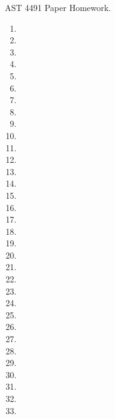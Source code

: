 \documentclass[12pt,preprint]{aastex}  %
\begin{document}
AST 4491 Paper Homework.

\begin{enumerate}
\item 
\item 
\item 
\item 
\item 
\item 
\item 
\item 
\item 
\item 
\item 
\item 
\item 
\item 
\item 
\item 
\item 
\item 
\item 
\item 
\item 
\item 
\item 
\item 
\item 
\item 
\item 
\item 
\item 
\item 
\item 
\item 
\item 
\end{enumerate}
\end{document}
